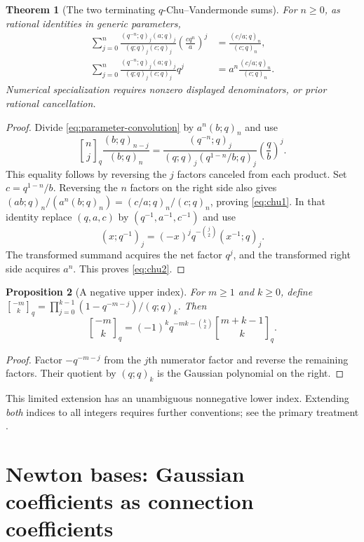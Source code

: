 \documentclass[11pt,a4paper]{article}
\numberwithin{equation}{section}
\newtheorem{theorem}{Theorem}[section]
\newtheorem{proposition}[theorem]{Proposition}
\theoremstyle{definition}
\theoremstyle{remark}
\newcommand{\G}[2]{\genfrac{[}{]}{0pt}{}{#1}{#2}_{q}}
\newcommand{\Gb}[3]{\genfrac{[}{]}{0pt}{}{#1}{#2}_{#3}}
\newcommand{\qp}[2]{(#1;q)_{#2}}
\begin{document}
\begin{theorem}[The two terminating $q$-Chu--Vandermonde sums]
\label{thm:chu}
For $n\ge0$, as rational identities in generic parameters,
\begin{align}
 \sum_{j=0}^n
 \frac{\qp{q^{-n}}j\qp aj}{\qp qj\qp cj}
       \left(\frac{cq^n}{a}\right)^j
 &=\frac{\qp{c/a}n}{\qp cn},
 \label{eq:chu1}\\
 \sum_{j=0}^n
 \frac{\qp{q^{-n}}j\qp aj}{\qp qj\qp cj}q^j
 &=a^n\frac{\qp{c/a}n}{\qp cn}.
 \label{eq:chu2}
\end{align}
Numerical specialization requires nonzero displayed denominators, or
prior rational cancellation.
\end{theorem}
\begin{proof}
Divide \cref{eq:parameter-convolution} by $a^n\qp bn$ and use
\begin{equation}
 \G nj\frac{\qp b{n-j}}{\qp bn}
 =\frac{\qp{q^{-n}}j}{\qp qj\qp{q^{1-n}/b}j}
       \left(\frac qb\right)^j.
 \label{eq:chu-conversion}
\end{equation}
This equality follows by reversing the $j$ factors canceled from each
product. Set $c=q^{1-n}/b$. Reversing the $n$ factors on the right side
also gives
$\qp{ab}n/(a^n\qp bn)=\qp{c/a}n/\qp cn$, proving
\cref{eq:chu1}. In that identity replace
$(q,a,c)$ by $(q^{-1},a^{-1},c^{-1})$ and use
\[
 (x;q^{-1})_j=(-x)^jq^{-\binom j2}(x^{-1};q)_j.
\]
The transformed summand acquires the net factor $q^j$, and the
transformed right side acquires $a^n$. This proves \cref{eq:chu2}.
\end{proof}

\begin{proposition}[A negative upper index]
For $m\ge1$ and $k\ge0$, define
$\Gb{-m}kq=\prod_{j=0}^{k-1}(1-q^{-m-j})/(q;q)_k$. Then
\begin{equation}
 \Gb{-m}kq=(-1)^kq^{-mk-\binom k2}\G{m+k-1}k.
 \label{eq:negative-top}
\end{equation}
\end{proposition}
\begin{proof}
Factor $-q^{-m-j}$ from the $j$th numerator factor and reverse the
remaining factors. Their quotient by $(q;q)_k$ is the Gaussian
polynomial on the right.
\end{proof}
This limited extension has an unambiguous nonnegative lower index.
Extending \emph{both} indices to all integers requires further
conventions; see the primary treatment \cite{formichella}.

\section{Newton bases: Gaussian coefficients as connection coefficients}
\label{sec:newton}
\end{document}
